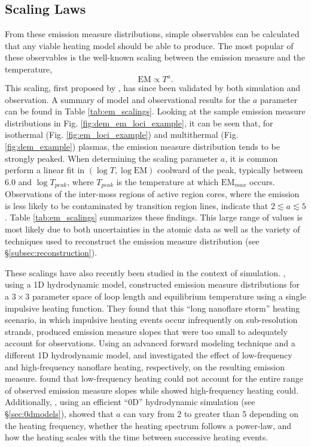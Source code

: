 \subsection{Scaling Laws}
\label{subsec:scaling}
%
\par From these emission measure distributions, simple observables can be calculated that any viable heating model should be able to produce. The most popular of these observables is the well-known scaling between the emission measure and the temperature, 
\begin{equation}
	\mathrm{EM}\propto T^a.
\end{equation}
This scaling, first proposed by \citet{jordan_energy_1980}, has since been validated by both simulation and observation. A summary of model and observational results for the $a$ parameter can be found in Table \ref{tab:em_scalings}. Looking at the sample emission measure distributions in Fig. \ref{fig:dem_em_loci_example}, it can be seen that, for isothermal (Fig. \ref{fig:em_loci_example}) and multithermal (Fig. \ref{fig:dem_example}) plasmas, the emission measure distribution tends to be strongly peaked. When determining the scaling parameter $a$, it is common perform a linear fit in $(\log{T},\log{\mathrm{EM}})$ coolward of the peak, typically between 6.0 and $\log{T_{peak}}$, where $T_{peak}$ is the temperature at which $\mathrm{EM}_{max}$ occurs. Observations of the inter-moss regions of active region cores, where the emission is less likely to be contaminated by transition region lines, indicate that $2\lesssim a\lesssim5$. Table \ref{tab:em_scalings} summarizes these findings. This large range of values is most likely due to both uncertainties in the atomic data as well as the variety of techniques used to reconstruct the emission measure distribution (see \S\ref{subsec:reconstruction}).
%
\par These scalings have also recently been studied in the context of simulation. \citet{mulu-moore_can_2011}, using a 1D hydrodynamic model, constructed emission measure distributions for a $3\times3$ parameter space of loop length and equilibrium temperature using a single impulsive heating function. They found that this ``long nanoflare storm'' heating scenario, in which impulsive heating events occur infrequently on sub-resolution strands, produced emission measure slopes that were too small to adequately account for observations. Using an advanced forward modeling technique and a different 1D hydrodynamic model, \citet{bradshaw_diagnosing_2012} and \citet{reep_diagnosing_2013} investigated the effect of low-frequency and high-frequency nanoflare heating, respectively, on the resulting emission measure. \citet{bradshaw_diagnosing_2012} found that low-frequency heating could not account for the entire range of observed emission measure slopes while \citet{reep_diagnosing_2013} showed high-frequency heating could. Additionally, \citet{cargill_active_2014}, using an efficient ``0D'' hydrodynamic simulation (see \S\ref{sec:0dmodels}), showed that $a$ can vary from 2 to greater than 5 depending on the heating frequency, whether the heating spectrum follows a power-law, and how the heating scales with the time between successive heating events.
